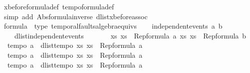 \begin{isabellebody}
\ xbefore{\isacharunderscore}formula{\isacharunderscore}def\ tempo{}{\isacharunderscore}formula{\isacharunderscore}def\isanewline
\ \ \isamarkupfalse%
\ {\isacharparenleft}simp\ add{\isacharcolon}\ Abs{\isacharunderscore}formula{\isacharunderscore}inverse\ dlist{\isacharunderscore}xbefore{\isacharunderscore}assoc{\isacharparenright}\isanewline
{}\isamarkupfalse%
%
\endisatagproof
{\isafoldproof}%
%
\isadelimproof
%
\endisadelimproof
\isanewline
\isanewline
{}\isamarkupfalse%
%
\isamarkuptrue%
\isamarkupfalse%
\ formula\ {\isacharcolon}{\isacharcolon}\ {\isacharparenleft}type{\isacharparenright}\ temporal{\isacharunderscore}faults{\isacharunderscore}algebra{\isacharunderscore}equivs\isanewline
{}\isanewline
\isanewline
{}\isamarkupfalse%
\ \isanewline
\ \ {\isachardoublequoteopen}independent{\isacharunderscore}events\ a\ b\ {\isacharequal}\ \isanewline
\ \ \ \ dlist{\isacharunderscore}independent{\isacharunderscore}events\ \isanewline
\ \ \ \ \ \ {\isacharparenleft}{\isasymlambda}xs{\isachardot}\ xs\ {\isasymin}\ Rep{\isacharunderscore}formula\ a{\isacharparenright}\ {\isacharparenleft}{\isasymlambda}xs{\isachardot}\ xs\ {\isasymin}\ Rep{\isacharunderscore}formula\ b{\isacharparenright}{\isachardoublequoteclose}\isanewline
\isanewline
{}\isamarkupfalse%
\ \isanewline
\ \ {\isachardoublequoteopen}tempo{}\ a\ {\isacharequal}\ dlist{\isacharunderscore}tempo{}\ {\isacharparenleft}{\isasymlambda}xs{\isachardot}\ xs\ {\isasymin}\ Rep{\isacharunderscore}formula\ a{\isacharparenright}{\isachardoublequoteclose}\isanewline
\isanewline
{}\isamarkupfalse%
\ \isanewline
\ \ {\isachardoublequoteopen}tempo{}\ a\ {\isacharequal}\ dlist{\isacharunderscore}tempo{}\ {\isacharparenleft}{\isasymlambda}xs{\isachardot}\ xs\ {\isasymin}\ Rep{\isacharunderscore}formula\ a{\isacharparenright}{\isachardoublequoteclose}\isanewline
\isanewline
{}\isamarkupfalse%
\ \isanewline
\ \ {\isachardoublequoteopen}tempo{}\ a\ {\isacharequal}\ dlist{\isacharunderscore}tempo{}\ {\isacharparenleft}{\isasymlambda}xs{\isachardot}\ xs\ {\isasymin}\ Rep{\isacharunderscore}formula\ a{\isacharparenright}{\isachardoublequoteclose}\isanewline
\isanewline
{}\isamarkupfalse%
%
\isadelimproof
\ %
\endisadelimproof
%
\isatagproof
{}\isamarkupfalse%
\isanewline
\ \ \isamarkupfalse%

\end{isabellebody}
